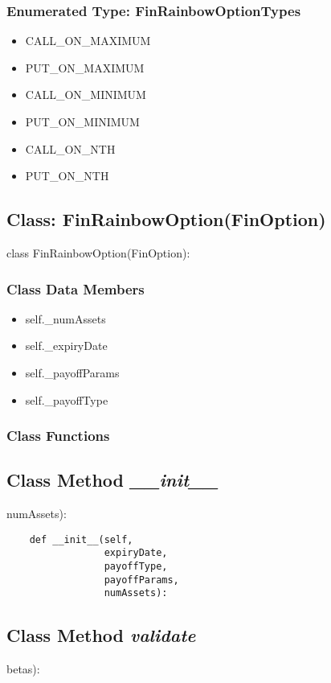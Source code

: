 \documentclass[twoside,11pt]{book}
\begin{document}
\subsubsection{Enumerated Type: FinRainbowOptionTypes}
\begin{itemize}
\item{CALL\_ON\_MAXIMUM}
\item{PUT\_ON\_MAXIMUM}
\item{CALL\_ON\_MINIMUM}
\item{PUT\_ON\_MINIMUM}
\item{CALL\_ON\_NTH}
\item{PUT\_ON\_NTH}
\end{itemize}

\subsection{Class: FinRainbowOption(FinOption)}
class FinRainbowOption(FinOption):

\subsubsection{Class Data Members}
\begin{itemize}
\item{self.\_numAssets}
\item{self.\_expiryDate}
\item{self.\_payoffParams}
\item{self.\_payoffType}
\end{itemize}

\subsubsection{Class Functions}

\subsection{Class Method {\it \_\_init\_\_}}
numAssets):

\begin{lstlisting}
    def __init__(self,
                 expiryDate,
                 payoffType,
                 payoffParams,
                 numAssets):
\end{lstlisting}

\subsection{Class Method {\it validate}}
betas):
\end{document}
